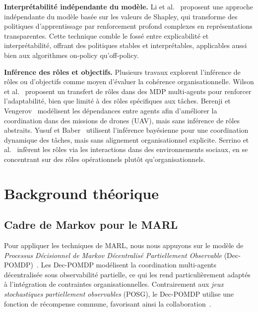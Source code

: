 \documentclass[pdflatex,sn-mathphys-num]{sn-jnl}%
\theoremstyle{thmstyleone}%
\theoremstyle{thmstyletwo}%
\theoremstyle{thmstylethree}%
\begin{document}
\textbf{Interprétabilité indépendante du modèle.} Li et al.~\cite{li2025from} proposent une approche indépendante du modèle basée sur les valeurs de Shapley, qui transforme des politiques d'apprentissage par renforcement profond complexes en représentations transparentes. Cette technique comble le fossé entre explicabilité et interprétabilité, offrant des politiques stables et interprétables, applicables aussi bien aux algorithmes on-policy qu'off-policy.

\textbf{Inférence des rôles et objectifs.} Plusieurs travaux explorent l'inférence de rôles ou d'objectifs comme moyen d'évaluer la cohérence organisationnelle. Wilson et al.~\cite{wilson2008learning} proposent un transfert de rôles dans des MDP multi-agents pour renforcer l'adaptabilité, bien que limité à des rôles spécifiques aux tâches. Berenji et Vengerov~\cite{berenji2000learning} modélisent les dépendances entre agents afin d'améliorer la coordination dans des missions de drones (UAV), mais sans inférence de rôles abstraits. Yusuf et Baber~\cite{yusuf2020inferential} utilisent l'inférence bayésienne pour une coordination dynamique des tâches, mais sans alignement organisationnel explicite. Serrino et al.~\cite{serrino2019finding} infèrent les rôles via les interactions dans des environnements sociaux, en se concentrant sur des rôles opérationnels plutôt qu'organisationnels.



\section{Background théorique}\label{sec:background}

\subsection{Cadre de Markov pour le MARL}

Pour appliquer les techniques de MARL, nous nous appuyons sur le modèle de \textit{Processus Décisionnel de Markov Décentralisé Partiellement Observable} (Dec-POMDP)~\cite{Oliehoek2016}. Les Dec-POMDP modélisent la coordination multi-agents décentralisée sous observabilité partielle, ce qui les rend particulièrement adaptés à l'intégration de contraintes organisationnelles. Contrairement aux \textit{jeux stochastiques partiellement observables} (POSG), le Dec-POMDP utilise une fonction de récompense commune, favorisant ainsi la collaboration~\cite{Beynier2013}.
\end{document}
